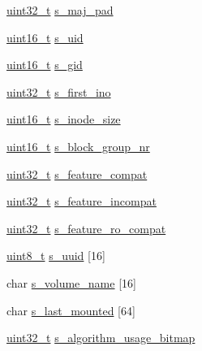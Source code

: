 \begin{DoxyCompactItemize}
\item 
\hyperlink{types_8h_a435d1572bf3f880d55459d9805097f62}{uint32\-\_\-t} \hyperlink{structext2__super__block_a0e91e778203e498adaf6fc27fa60abe2}{s\-\_\-maj\-\_\-pad}
\item 
\hyperlink{types_8h_a273cf69d639a59973b6019625df33e30}{uint16\-\_\-t} \hyperlink{structext2__super__block_aef2bb376f4e66e6cd33171fb9497405c}{s\-\_\-uid}
\item 
\hyperlink{types_8h_a273cf69d639a59973b6019625df33e30}{uint16\-\_\-t} \hyperlink{structext2__super__block_a84a06961e920689385e1fda033063d72}{s\-\_\-gid}
\item 
\hyperlink{types_8h_a435d1572bf3f880d55459d9805097f62}{uint32\-\_\-t} \hyperlink{structext2__super__block_a0d3a8f3c14e0a971750cfdfbc2cf6070}{s\-\_\-first\-\_\-ino}
\item 
\hyperlink{types_8h_a273cf69d639a59973b6019625df33e30}{uint16\-\_\-t} \hyperlink{structext2__super__block_a9a1ee9cd5f706fa2e753a4c781ebae73}{s\-\_\-inode\-\_\-size}
\item 
\hyperlink{types_8h_a273cf69d639a59973b6019625df33e30}{uint16\-\_\-t} \hyperlink{structext2__super__block_aa69ff4c80207a79de2464e3065df607c}{s\-\_\-block\-\_\-group\-\_\-nr}
\item 
\hyperlink{types_8h_a435d1572bf3f880d55459d9805097f62}{uint32\-\_\-t} \hyperlink{structext2__super__block_a1cf404a1bcfb748e924c62032cd723a5}{s\-\_\-feature\-\_\-compat}
\item 
\hyperlink{types_8h_a435d1572bf3f880d55459d9805097f62}{uint32\-\_\-t} \hyperlink{structext2__super__block_a56005d1ae97dc32f86567d018c753440}{s\-\_\-feature\-\_\-incompat}
\item 
\hyperlink{types_8h_a435d1572bf3f880d55459d9805097f62}{uint32\-\_\-t} \hyperlink{structext2__super__block_a9c63e7954f0344d3de19aad4099d84c7}{s\-\_\-feature\-\_\-ro\-\_\-compat}
\item 
\hyperlink{types_8h_aba7bc1797add20fe3efdf37ced1182c5}{uint8\-\_\-t} \hyperlink{structext2__super__block_a1a546d295c2dc760ece8bf44c7623eb3}{s\-\_\-uuid} \mbox{[}16\mbox{]}
\item 
char \hyperlink{structext2__super__block_aafa5ddd1cf9fbf19aa2b80e83bff5a43}{s\-\_\-volume\-\_\-name} \mbox{[}16\mbox{]}
\item 
char \hyperlink{structext2__super__block_ad2849dfeab713d00ddd93c97eaf80cea}{s\-\_\-last\-\_\-mounted} \mbox{[}64\mbox{]}
\item 
\hyperlink{types_8h_a435d1572bf3f880d55459d9805097f62}{uint32\-\_\-t} \hyperlink{structext2__super__block_ab3772dfdb48734922447cc462e5495ed}{s\-\_\-algorithm\-\_\-usage\-\_\-bitmap}

\end{DoxyCompactItemize}
